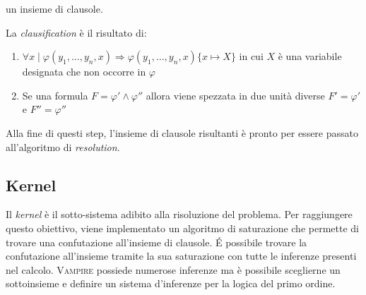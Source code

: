 \begin{description}
    un insieme di clausole.
    \begin{definition}
        La \emph{clausification} è il risultato di:
        \begin{enumerate}
            \item $\forall x\mid\varphi(y_1,\dots,y_n,x)\Rightarrow\varphi(y_1,\dots,y_n,x)\{x \mapsto X\}$  in cui $X$ è una variabile designata che non occorre in $\varphi$
            \item Se una formula $F=\varphi'\land\varphi''$ allora viene spezzata in due unità diverse 
            $F'=\varphi'$ e $F''=\varphi''$
        \end{enumerate}
    \end{definition}  
\end{description} 
Alla fine di questi step, l'insieme di clausole risultanti è pronto per essere passato all'algoritmo di \emph{resolution}.
\subsection{Kernel}
Il \emph{kernel} è il sotto-sistema adibito alla risoluzione del problema. Per raggiungere questo obiettivo, 
viene implementato un algoritmo di saturazione che permette di trovare una confutazione all'insieme di clausole.
\'E possibile trovare la confutazione all'insieme tramite la sua saturazione con tutte le inferenze presenti nel calcolo. 
\textsc{Vampire} possiede numerose inferenze ma è possibile sceglierne un sottoinsieme e definire un sistema 
d'inferenze per la logica del primo ordine.

